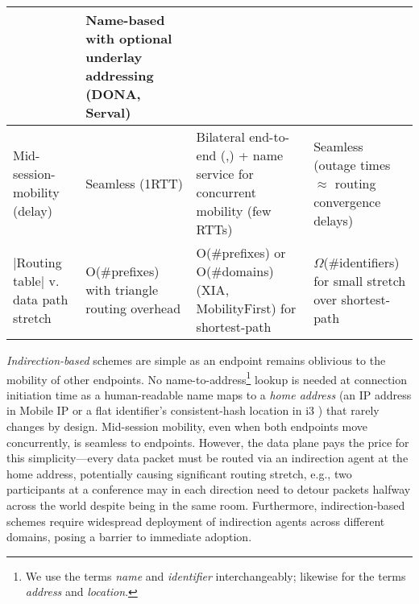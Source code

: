 {\begin{table*}[t]
{\begin{tabular}{|p{1in}|p{1.2in}|p{2.2in}|p{2in}|}
& Name-based  with optional underlay addressing (DONA\cite{DONA}, Serval\cite{serval}) \\ 
\hline
Mid-session-mobility  (delay) &  Seamless (1RTT) & 
  
Bilateral end-to-end (\cite{Migrate},\cite{ECCP}) + name service for concurrent mobility (few RTTs)

& 
Seamless (outage times $\approx$ routing convergence delays)
\\  
\hline
|Routing table| v. data path stretch &  O(\#prefixes) with triangle routing overhead & O(\#prefixes) or O(\#domains) (XIA\cite{XIA}, MobilityFirst\cite{MobilityFirst-UMASS}) for shortest-path & 

$\Omega$(\#identifiers) for small stretch over shortest-path \cite{compact-routing}
\\

 \hline
\end{tabular}
}
\vspace{-0.15in}
\caption{Tripartite classification (indirection-based, logically-centralized, network-layer) of many alternative naming and routing approaches based on how they handle mobility.}
\vspace{-0.1in}
\label{tab:arch}
\end{table*}


{\em Indirection-based} schemes are simple as an endpoint remains oblivious to the mobility of other endpoints. No name-to-address\footnote{We use the terms {\em name} and {\em identifier} interchangeably; likewise for the terms {\em address} and {\em location}.} lookup is needed at connection initiation time as a human-readable name maps to a {\em home address} (an IP address in Mobile IP \cite{MIP} or a flat identifier's consistent-hash location in i3 \cite{i3}) that rarely changes by design. Mid-session mobility, even when both endpoints move concurrently, is seamless to endpoints. However, the data plane pays the price for this simplicity---every data packet must be routed via an indirection agent at the home address, potentially causing significant routing stretch, e.g., two participants at a conference may in each direction need to detour packets halfway across the world despite being in the same  room. %
Furthermore, indirection-based schemes require widespread deployment of indirection agents across different domains, posing a barrier to immediate adoption.

}
